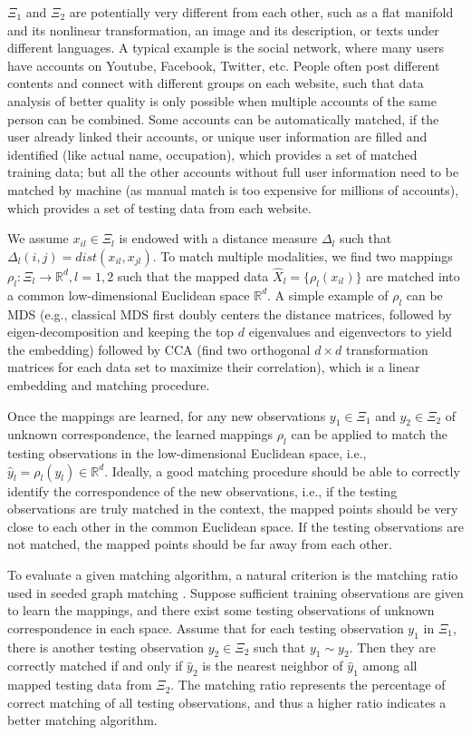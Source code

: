 \documentclass[times,twocolumn,final]{elsarticle}
\begin{document}
$\Xi_{1}$ and $\Xi_{2}$ are potentially very different from each other, such as a flat manifold and its nonlinear transformation, an image and its description, or texts under different languages. A typical example is the social network, where many users have accounts on Youtube, Facebook, Twitter, etc. People often post different contents and connect with different groups on each website, such that data analysis of better quality is only possible when multiple accounts of the same person can be combined. Some accounts can be automatically matched, if the user already linked their accounts, or unique user information are filled and identified (like actual name, occupation), which provides a set of matched training data; but all the other accounts without full user information need to be matched by machine (as manual match is too expensive for millions of accounts), which provides a set of testing data from each website.

We assume $x_{il} \in \Xi_{l}$ is endowed with a distance measure $\Delta_{l}$ such that $\Delta_{l}(i,j)=dist(x_{il},x_{jl})$. To match multiple modalities, we find two mappings $\rho_{l}: \Xi_{l} \rightarrow \mathbb{R}^{d}, l=1,2$ such that the mapped data $\hat{X}_{l}=\{ \rho_{l}(x_{il}) \}$ are matched into a common low-dimensional Euclidean space $\mathbb{R}^{d}$. A simple example of $\rho_{l}$ can be MDS (e.g., classical MDS first doubly centers the distance matrices, followed by eigen-decomposition and keeping the top $d$ eigenvalues and eigenvectors to yield the embedding) followed by CCA (find two orthogonal $d \times d$ transformation matrices for each data set to maximize their correlation), which is a linear embedding and matching procedure.

Once the mappings are learned, for any new observations $y_{1} \in \Xi_{1}$ and $y_{2} \in \Xi_{2}$ of unknown correspondence, the learned mappings $\rho_{l}$ can be applied to match the testing observations in the low-dimensional Euclidean space, i.e., $\hat{y}_{l} = \rho_{l}(y_{l}) \in \mathbb{R}^{d}$. Ideally, a good matching procedure should be able to correctly identify the correspondence of the new observations, i.e., if the testing observations are truly matched in the context, the mapped points should be very close to each other in the common Euclidean space. If the testing observations are not matched, the mapped points should be far away from each other.

To evaluate a given matching algorithm, a natural criterion is the matching ratio used in seeded graph matching \citep{LyzinskiFishkindPriebe2014}. Suppose sufficient training observations are given to learn the mappings, and there exist some testing observations of unknown correspondence in each space. Assume that for each testing observation $y_{1}$ in $\Xi_{1}$, there is another testing observation $y_{2} \in \Xi_{2}$ such that $y_{1} \sim y_{2}$. Then they are correctly matched if and only if $\hat{y}_{2}$ is the nearest neighbor of $\hat{y}_{1}$ among all mapped testing data from $\Xi_{2}$. The matching ratio represents the percentage of correct matching of all testing observations, and thus a higher ratio indicates a better matching algorithm. 
\end{document}
